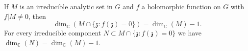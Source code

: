 If $M$ is an irreducible analytic set in $G$ and $f$ a holomorphic function on $G$ with $f|M \neq 0$, then
$$\dim_{\mathbb{C}}(M \cap \{ \mathfrak{z} : f(\mathfrak{z}) = 0 \}) = \dim_{\mathbb{C}}(M) - 1.$$
For every irreducible component $N \subset M \cap \{ \mathfrak{z} : f(\mathfrak{z}) = 0 \}$ we have $\dim_{\mathbb{C}}(N) = \dim_{\mathbb{C}}(M) - 1$.
